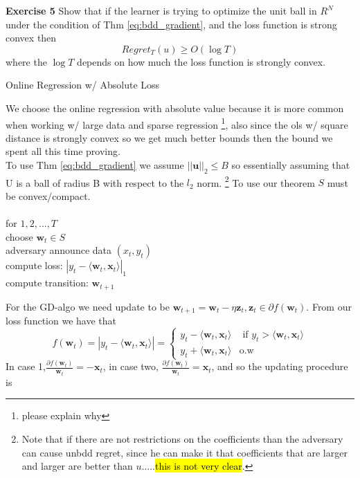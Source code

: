 \documentclass[11pt]{article}
\newcommand\tab[1][1cm]{\hspace*{#1}}
\theoremstyle{quest}
\begin{document}
\begin{tcolorbox}
\textbf{Exercise 5} Show that if the learner is trying to optimize the unit ball in $R^N$ under the condition of {\color{blue} Thm \eqref{eq:bdd_gradient}}, and  the loss function is  strong convex then   $$Regret_T(u)\ge O(\log T)$$ where the $\log T$ depends on how much the loss function is strongly convex. 
\end{tcolorbox}

\begin{tcolorbox}
\begin{center}Online Regression w/ Absolute Loss \end{center}
We choose the online regression with absolute value because it is more common when working w/ large data and sparse regression \footnote{ please explain why}, also since the ols w/ square distance is strongly convex so we get much better bounds then the bound we spent all this time proving. \\
To use {\color{blue} Thm \eqref{eq:bdd_gradient}} we assume $||\mathbf{u}||_2\le B$ so essentially assuming that U is a ball of radius B with respect to the $l_2$ norm. \footnote{Note that if there are not restrictions on the coefficients than the adversary can cause unbdd regret, since he can make it that coefficients that are larger and larger are better than $u$.....\hl{this is not very clear}.} To use our theorem $S$ must be convex/compact. \\ \\ 
for $1, 2, \dots, T$\\
\tab choose $\mathbf{w}_t \in S$\\
\tab adversary announce data $(x_t, y_t)$\\
\tab compute loss: $|y_t - \langle \mathbf{w}_t, \mathbf{x}_t \rangle |_1$\\  
\tab compute transition: $\mathbf{w}_{t+1}$

For the GD-algo we need update to be $\mathbf{w}_{t+1}=\mathbf{w}_{t}-\eta \mathbf{z}_{t}, \mathbf{z}_{t} \in \partial f(\mathbf{w}_t)$. From our loss function we have that $$f(\mathbf{w}_t)= |y_t - \langle \mathbf{w}_t, \mathbf{x}_t \rangle | = \begin{cases} y_t - \langle \mathbf{w}_t, \mathbf{x}_t \rangle  & \text{ if } y_t > \langle \mathbf{w}_t, \mathbf{x}_t \rangle\\
y_t + \langle \mathbf{w}_t, \mathbf{x}_t \rangle & \text{o.w}
\end{cases}$$
In case 1,$\frac{\partial f(\mathbf{w}_t) }{\mathbf{w}_t}= -\mathbf{x}_t$, in case two, $\frac{\partial f(\mathbf{w}_t) }{\mathbf{w}_t}= \mathbf{x}_t$, and so the updating procedure is 


\end{tcolorbox}
\end{document}
